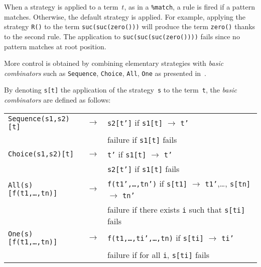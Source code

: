 \documentclass[runningheads]{llncs}
\begin{document}

When a strategy is applied to a term~$t$, as in a \texttt{\%match}, a rule is
fired if a pattern matches. Otherwise, the default strategy is applied.
For example, applying the strategy \texttt{R()} to the term
\texttt{suc(suc(zero()))} will produce the term \texttt{zero()} thanks to the
second rule. The application to \texttt{suc(suc(suc(zero())))} fails since no
pattern matches at root position.

More control is obtained by combining elementary strategies with \emph{basic
combinators} such as \texttt{Sequence}, \texttt{Choice},
\texttt{All}, \texttt{One} as presented
in~\cite{BKK98,visser-icfp98}.

By denoting \texttt{s[t]} the application of the strategy~\texttt{s} to the
term~\texttt{t}, the \emph{basic combinators} are defined as follows:

\begin{small}
\begin{tabular}{lll}

\texttt{Sequence(s1,s2)[t]} & $\rightarrow$ & \texttt{s2[t']} if \texttt{s1[t]}
$\rightarrow$ \texttt{t'}\\
&& failure if \texttt{s1[t]} fails\\

\texttt{Choice(s1,s2)[t]} & $\rightarrow$ & \texttt{t'} if \texttt{s1[t]}
$\rightarrow$ \texttt{t'}\\
&& \texttt{s2[t']} if \texttt{s1[t]} fails\\

\texttt{All(s)[f(t1,\ldots,tn)]} & $\rightarrow$ & \texttt{f(t1',\ldots,tn')}
if \texttt{s[t1]} $\rightarrow$ \texttt{t1'},\ldots, \texttt{s[tn]}
$\rightarrow$ \texttt{tn'}\\
&& failure if there exists \texttt{i} such that \texttt{s[ti]} fails\\

\texttt{One(s)[f(t1,\ldots,tn)]} & $\rightarrow$ &
\texttt{f(t1,\ldots,ti',\ldots,tn)} if \texttt{s[ti]}  $\rightarrow$
\texttt{ti'}\\
&& failure if for all \texttt{i}, \texttt{s[ti]} fails\\
\end{tabular}
\end{small}
\end{document}
